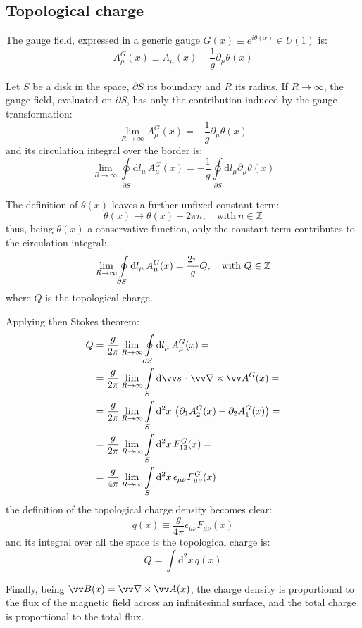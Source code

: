 \subsection*{Topological charge}

The gauge field, expressed in a generic gauge $G(x) \equiv e^{i\theta(x)} \in U(1)$ is:
\[
    A^G_\mu(x) \equiv A_\mu(x) - \frac{1}{g}\partial_\mu\theta(x)
\]

Let $S$ be a disk in the space, $\partial S$ its boundary and $R$ its radius.
If $R \to \infty$, the gauge field, evaluated on $\partial S$,
has only the contribution induced by the gauge transformation:
\[
    \lim_{R\to\infty}A^G_\mu(x) = -\frac{1}{g}\partial_\mu\theta(x)
\]
and its circulation integral over the border is:
\[
    \lim_{R\to\infty}\oint\limits_{\partial S}\mathrm dl_\mu\,A^G_\mu(x) = -\frac{1}{g}\oint\limits_{\partial S}\mathrm dl_\mu\partial_\mu\theta(x)
\]

The definition of $\theta(x)$ leaves a further unfixed constant term:
\[
    \theta(x) \rightarrow \theta(x) + 2\pi n, \quad \text{with}\ n \in \mathbb Z
\]
thus, being $\theta(x)$ a conservative function, only the constant term contributes to the circulation integral:
\[
    \lim_{R\to\infty}\oint\limits_{\partial S}\mathrm dl_\mu\,A^G_\mu(x) = \frac{2\pi}{g} Q, \quad \text{with}\ Q \in \mathbb Z \\
\]
where $Q$ is the topological charge.

Applying then Stokes theorem:
\begin{align*}
    Q &= \frac{g}{2\pi}\lim_{R\to\infty}\oint\limits_{\partial S}\mathrm dl_\mu\,A^G_\mu(x) = \\
      &= \frac{g}{2\pi}\lim_{R\to\infty}\int\limits_S\mathrm d\vv s\,\cdot \vv\nabla \times \vv A^G(x) = \\
      &= \frac{g}{2\pi}\lim_{R\to\infty}\int\limits_S\mathrm d^2x\, \left(\partial_1 A^G_2(x) - \partial_2 A^G_1(x)\right) = \\
      &= \frac{g}{2\pi}\lim_{R\to\infty}\int\limits_S\mathrm d^2x\, F^G_{12}(x) = \\
      &= \frac{g}{4\pi}\lim_{R\to\infty}\int\limits_S\mathrm d^2x\, \epsilon_{\mu\nu}F^G_{\mu\nu}(x)
\end{align*}
the definition of the topological charge density becomes clear:
\[
    q(x) \equiv \frac{g}{4\pi}\epsilon_{\mu\nu}F_{\mu\nu}(x)
\]
and its integral over all the space is the topological charge is:
\[
    Q = \int\mathrm d^2x\,q(x)
\]

Finally, being $\vv B(x) = \vv\nabla \times \vv A(x)$, the charge density is proportional to the flux of the magnetic field across an infinitesimal surface,
and the total charge is proportional to the total flux.

